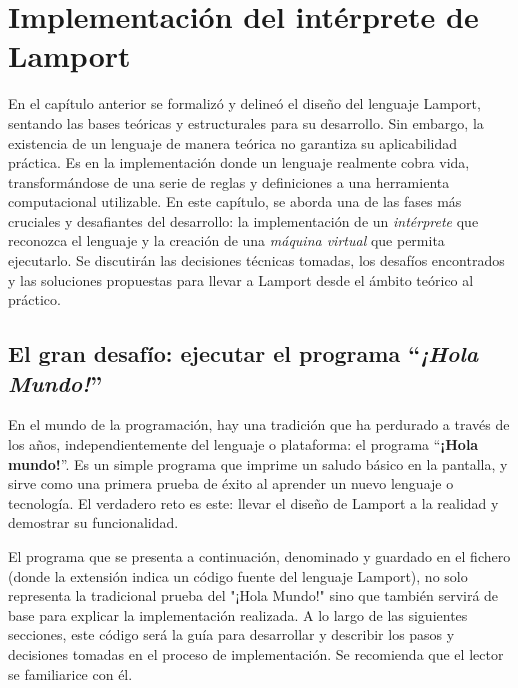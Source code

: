 \chapter{\textbf{Implementación del intérprete de Lamport}}

En el capítulo anterior se formalizó y delineó el diseño del lenguaje Lamport, sentando las bases teóricas y estructurales para su desarrollo. Sin embargo, la existencia de un lenguaje de manera teórica no garantiza su aplicabilidad práctica. Es en la implementación donde un lenguaje realmente cobra vida, transformándose de una serie de reglas y definiciones a una herramienta computacional utilizable. En este capítulo, se aborda una de las fases más cruciales y desafiantes del desarrollo: la implementación de un \textit{intérprete} que reconozca el lenguaje y la creación de una \textit{máquina virtual} que permita ejecutarlo. Se discutirán las decisiones técnicas tomadas, los desafíos encontrados y las soluciones propuestas para llevar a Lamport desde el ámbito teórico al práctico.

\section{El gran desafío: ejecutar el programa ``\textit{¡Hola Mundo!}''}
En el mundo de la programación, hay una tradición que ha perdurado a través de los años, independientemente del lenguaje o plataforma: el programa ``\textbf{¡Hola mundo!}''. Es un simple programa que imprime un saludo básico en la pantalla, y sirve como una primera prueba de éxito al aprender un nuevo lenguaje o tecnología. El verdadero reto es este: llevar el diseño de Lamport a la realidad y demostrar su funcionalidad.




El programa que se presenta a continuación, denominado  y guardado en el fichero  (donde la extensión  indica un código fuente del lenguaje Lamport), no solo representa la tradicional prueba del "¡Hola Mundo!" sino que también servirá de base para explicar la implementación realizada. A lo largo de las siguientes secciones, este código será la guía para desarrollar y describir los pasos y decisiones tomadas en el proceso de implementación. Se recomienda que el lector se familiarice con él.

\newpage

